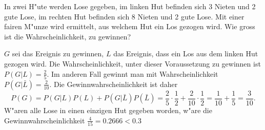 In zwei H"ute werden Lose gegeben, im linken Hut befinden sich
3 Nieten  und 2 gute Lose, im rechten Hut befinden sich 8 Nieten
und 2 gute Lose. Mit einer fairen M"unze wird ermittelt, aus welchem
Hut ein Los gezogen wird. Wie gross ist die Wahrscheinlichkeit, zu
gewinnen?

\begin{loesung}
$G$ sei das Ereignis zu gewinnen,
$L$ das Ereignis, dass ein Los aus dem linken Hut gezogen wird.
Die Wahrscheinlichkeit, unter dieser Voraussetzung zu gewinnen ist
$P(G|L)=\frac25$. Im anderen Fall gewinnt man mit Wahrscheinlichkeit
$P(G|\bar L)=\frac2{10}$. Die Gewinnwahrscheinlichkeit ist daher
$$P(G)=P(G|L)P(L)+P(G|\bar L)P(\bar L)=\frac25\cdot \frac12+\frac2{10}\cdot\frac12=\frac1{10}+\frac15=\frac3{10}.$$
W"aren alle Lose in einen einzigen Hut gegeben worden, w"are die
Gewinnwahrscheinlichkeit $\frac{4}{15}=0.2666<0.3$
\end{loesung}

